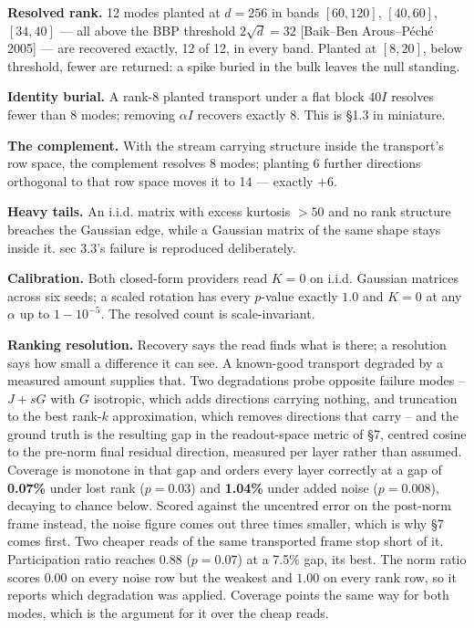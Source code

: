 \documentclass[10pt,letterpaper,twocolumn]{article}
\begin{document}
\textbf{Resolved rank.} 12 modes planted at \(d=256\) in bands \([60,120]\), \([40,60]\), \([34,40]\) --- all above the BBP threshold \(2\sqrt d=32\) {[}Baik--Ben Arous--Péché 2005{]} --- are recovered exactly, 12 of 12, in every band. Planted at \([8,20]\), below threshold, fewer are returned: a spike buried in the bulk leaves the null standing.

\textbf{Identity burial.} A rank-8 planted transport under a flat block \(40I\) resolves fewer than 8 modes; removing \(\alpha I\) recovers exactly 8. This is §1.3 in miniature.

\textbf{The complement.} With the stream carrying structure inside the transport's row space, the complement resolves 8 modes; planting 6 further directions orthogonal to that row space moves it to 14 --- exactly \(+6\).

\textbf{Heavy tails.} An i.i.d. matrix with excess kurtosis \(>50\) and no rank structure breaches the Gaussian edge, while a Gaussian matrix of the same shape stays inside it. sec 3.3's failure is reproduced deliberately.

\textbf{Calibration.} Both closed-form providers read \(K=0\) on i.i.d. Gaussian matrices across six seeds; a scaled rotation has every \(p\)-value exactly \(1.0\) and \(K=0\) at any \(\alpha\) up to \(1-10^{-5}\). The resolved count is scale-invariant.

\textbf{Ranking resolution.} Recovery says the read finds what is there; a resolution says how small a difference it can see. A known-good transport degraded by a measured amount supplies that. Two degradations probe opposite failure modes -- \(J + sG\) with \(G\) isotropic, which adds directions carrying nothing, and truncation to the best rank-\(k\) approximation, which removes directions that carry -- and the ground truth is the resulting gap in the readout-space metric of §7, centred cosine to the pre-norm final residual direction, measured per layer rather than assumed. Coverage is monotone in that gap and orders every layer correctly at a gap of \textbf{0.07\%} under lost rank (\(p=0.03\)) and \textbf{1.04\%} under added noise (\(p=0.008\)), decaying to chance below. Scored against the uncentred error on the post-norm frame instead, the noise figure comes out three times smaller, which is why §7 comes first. Two cheaper reads of the same transported frame stop short of it. Participation ratio reaches 0.88 (\(p=0.07\)) at a 7.5\% gap, its best. The norm ratio scores \(0.00\) on every noise row but the weakest and \(1.00\) on every rank row, so it reports which degradation was applied. Coverage points the same way for both modes, which is the argument for it over the cheap reads.
\end{document}
